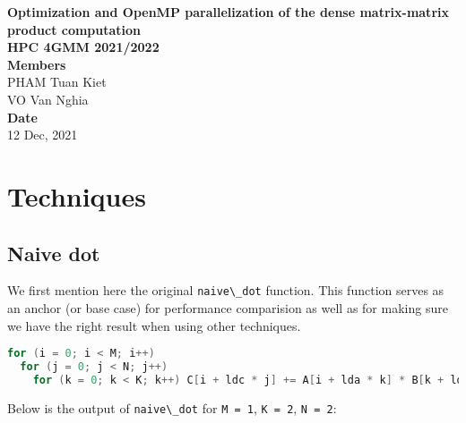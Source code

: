 \documentclass[
  12pt,
  xcolor = usenames,dvipsnames]{article}
\author{}
\date{\vspace{-2.5em}}
\newcommand{\passthrough}[1]{#1}
\begin{document}
\onehalfspacing


\vspace*{\fill}
\begin{center}
  \LARGE{\textbf{Optimization and OpenMP parallelization of the dense matrix-matrix product computation}}\\
  \Large{\textbf{HPC 4GMM 2021/2022}}\\
  \vspace*{1\baselineskip}
  \Large{\textbf{Members}}\\
  PHAM Tuan Kiet\\
  VO Van Nghia\\
  \vfill %
  \vspace*{\fill}
  \Large{\textbf{Date}}\\
  12 Dec, 2021
\end{center}

\newpage

\newpage
{}
\tableofcontents
{}

\newpage
{}

\hypertarget{techniques}{%
\section{Techniques}\label{techniques}}

\hypertarget{naive-dot}{%
\subsection{Naive dot}\label{naive-dot}}

We first mention here the original \passthrough{\lstinline!naive\_dot!} function. This function serves as an anchor (or base case) for performance comparision as well as for making sure we have the right result when using other techniques.

\begin{lstlisting}[language=C]
for (i = 0; i < M; i++)
  for (j = 0; j < N; j++)
    for (k = 0; k < K; k++) C[i + ldc * j] += A[i + lda * k] * B[k + ldb * j];
\end{lstlisting}

Below is the output of \passthrough{\lstinline!naive\_dot!} for \passthrough{\lstinline!M = 1!}, \passthrough{\lstinline!K = 2!}, \passthrough{\lstinline!N = 2!}:
\end{document}
